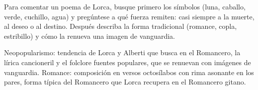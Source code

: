 \documentclass{book}
\begin{document}

\begin{tcolorbox}[title={Consejo}, studiumtip, breakable]

Para comentar un poema de Lorca, busque primero los símbolos (luna, caballo, verde, cuchillo, agua) y pregúntese a qué fuerza remiten: casi siempre a la muerte, al deseo o al destino. Después describa la forma tradicional (romance, copla, estribillo) y cómo la renueva una imagen de vanguardia.

\end{tcolorbox}

\begin{tcolorbox}[title={Definición}, studiumdef, breakable]

Neopopularismo: tendencia de Lorca y Alberti que busca en el Romancero, la lírica cancioneril y el folclore fuentes populares, que se renuevan con imágenes de vanguardia. Romance: composición en versos octosílabos con rima asonante en los pares, forma típica del Romancero que Lorca recupera en el Romancero gitano.

\end{tcolorbox}
\end{document}
